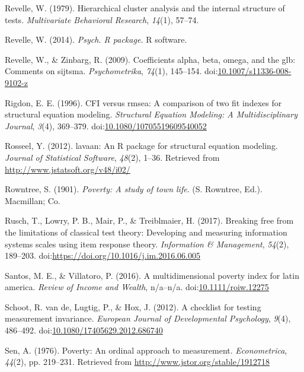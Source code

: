 \documentclass[]{book}
\begin{document}
\leavevmode\hypertarget{ref-Revelle1979}{}%
Revelle, W. (1979). Hierarchical cluster analysis and the internal structure of tests. \emph{Multivariate Behavioral Research}, \emph{14}(1), 57--74.

\leavevmode\hypertarget{ref-Revelle2014}{}%
Revelle, W. (2014). \emph{Psych. R package.} R software.

\leavevmode\hypertarget{ref-Revelle2009}{}%
Revelle, W., \& Zinbarg, R. (2009). Coefficients alpha, beta, omega, and the glb: Comments on sijtsma. \emph{Psychometrika}, \emph{74}(1), 145--154. doi:\href{https://doi.org/10.1007/s11336-008-9102-z}{10.1007/s11336-008-9102-z}

\leavevmode\hypertarget{ref-Rigdon1996}{}%
Rigdon, E. E. (1996). CFI versus rmsea: A comparison of two fit indexes for structural equation modeling. \emph{Structural Equation Modeling: A Multidisciplinary Journal}, \emph{3}(4), 369--379. doi:\href{https://doi.org/10.1080/10705519609540052}{10.1080/10705519609540052}

\leavevmode\hypertarget{ref-Rosseel2012}{}%
Rosseel, Y. (2012). lavaan: An R package for structural equation modeling. \emph{Journal of Statistical Software}, \emph{48}(2), 1--36. Retrieved from \url{http://www.jstatsoft.org/v48/i02/}

\leavevmode\hypertarget{ref-Rowntree1901}{}%
Rowntree, S. (1901). \emph{Poverty: A study of town life}. (S. Rowntree, Ed.). Macmillan; Co.

\leavevmode\hypertarget{ref-Rusch2017}{}%
Rusch, T., Lowry, P. B., Mair, P., \& Treiblmaier, H. (2017). Breaking free from the limitations of classical test theory: Developing and measuring information systems scales using item response theory. \emph{Information \& Management}, \emph{54}(2), 189--203. doi:\href{https://doi.org/https://doi.org/10.1016/j.im.2016.06.005}{https://doi.org/10.1016/j.im.2016.06.005}

\leavevmode\hypertarget{ref-Santos2016}{}%
Santos, M. E., \& Villatoro, P. (2016). A multidimensional poverty index for latin america. \emph{Review of Income and Wealth}, n/a--n/a. doi:\href{https://doi.org/10.1111/roiw.12275}{10.1111/roiw.12275}

\leavevmode\hypertarget{ref-Schoot2012}{}%
Schoot, R. van de, Lugtig, P., \& Hox, J. (2012). A checklist for testing measurement invariance. \emph{European Journal of Developmental Psychology}, \emph{9}(4), 486--492. doi:\href{https://doi.org/10.1080/17405629.2012.686740}{10.1080/17405629.2012.686740}

\leavevmode\hypertarget{ref-Sen1976}{}%
Sen, A. (1976). Poverty: An ordinal approach to measurement. \emph{Econometrica}, \emph{44}(2), pp. 219--231. Retrieved from \url{http://www.jstor.org/stable/1912718}
\end{document}
